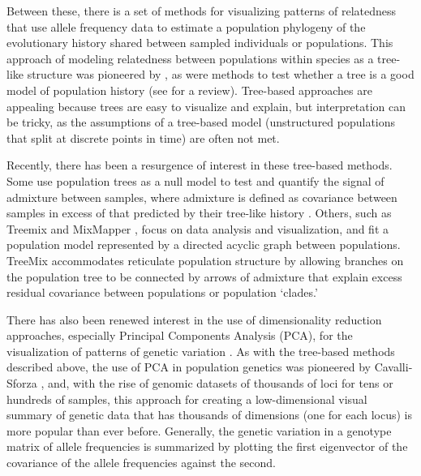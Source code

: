 \documentclass[12pt]{article}
\begin{document}
Between these, there is a set of methods for visualizing patterns of relatedness that use allele frequency data to estimate a population phylogeny of the evolutionary history shared between sampled individuals or populations.  This approach of modeling relatedness between populations within species as a tree-like structure was pioneered by \cite{cavallisforza_edwards1967}, as were methods to test whether a tree is a good model of population history \citep{CavalliSforza1975} (see \citep{Felsenstein1982} for a review).
Tree-based approaches are appealing because trees are easy to visualize and explain,
but interpretation can be tricky,
as the assumptions of a tree-based model
(unstructured populations that split at discrete points in time)
are often not met.
 
Recently, there has been a resurgence of interest in these tree-based methods.  Some use population trees as a null model to test and quantify the signal of admixture between samples, where admixture is defined as covariance between samples in excess of that predicted by their tree-like history \cite{reich_india_2009}.  Others, such as Treemix \citep{Treemix} and MixMapper \citep{lipson_mixmapper_2013}, focus on data analysis and visualization, and fit a population model represented by a directed acyclic graph between populations.  TreeMix accommodates reticulate population structure by allowing branches on the population tree to be connected by arrows of admixture that explain excess residual covariance between populations or population `clades.'

There has also been renewed interest in the use of dimensionality reduction approaches, especially Principal Components Analysis (PCA), for the visualization of patterns of genetic variation \citep{Patterson2006}.  As with the tree-based methods described above, the use of PCA in population genetics was pioneered by Cavalli-Sforza \citep{menozzi1978synthetic}, and, with the rise of genomic datasets of thousands of loci for tens or hundreds of samples, this approach for creating a low-dimensional visual summary of genetic data that has thousands of dimensions (one for each locus) is more popular than ever before.  Generally, the genetic variation in a genotype matrix of allele frequencies is summarized by plotting the first eigenvector of the covariance of the allele frequencies against the second. 
\end{document}
